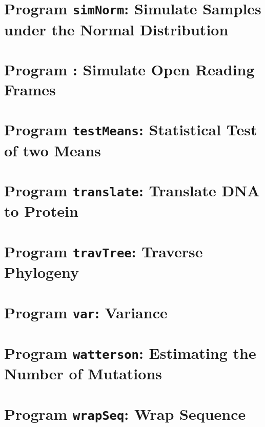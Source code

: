 \documentclass[a4paper]{report}
\begin{document}
\chapter{Program \texttt{simNorm}: Simulate Samples under the Normal
  Distribution}\label{ch:sn}

\chapter{Program : Simulate Open Reading
  Frames}\label{ch:so}

\chapter{Program \texttt{testMeans}: Statistical Test of two Means}\label{ch:tm}

\chapter{Program \texttt{translate}: Translate DNA to
  Protein}\label{ch:tr}

\chapter{Program \texttt{travTree}: Traverse Phylogeny}\label{ch:tt}

\chapter{Program \texttt{var}: Variance}\label{ch:var}

\chapter{Program \texttt{watterson}: Estimating the Number of Mutations}\label{ch:wat}

\chapter{Program \texttt{wrapSeq}: Wrap Sequence}\label{ch:wra}



\end{document}
